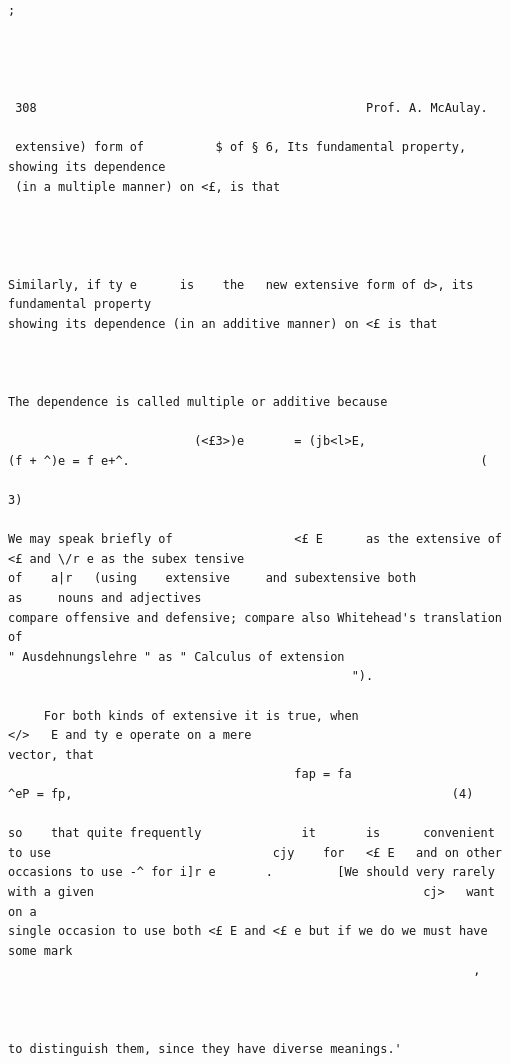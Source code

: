 \documentclass[10pt]{article}
\begin{document}
\begin{verbatim}

                                                                                                                                                 ;




 308                                              Prof. A. McAulay.

 extensive) form of          $ of § 6, Its fundamental property, showing its dependence
 (in a multiple manner) on <£, is that




Similarly, if ty e      is    the   new extensive form of d>, its fundamental property
showing its dependence (in an additive manner) on <£ is that



The dependence is called multiple or additive because

                          (<£3>)e       = (jb<l>E,                       (f + ^)e = f e+^.                                                 (
                                                                                                                                               3)

We may speak briefly of                 <£ E      as the extensive of <£ and \/r e as the subex tensive
of    a|r   (using    extensive     and subextensive both                                                as     nouns and adjectives
compare offensive and defensive; compare also Whitehead's translation of
" Ausdehnungslehre " as " Calculus of extension
                                                ").

     For both kinds of extensive it is true, when                                             </>   E and ty e operate on a mere
vector, that
                                        fap = fa                             ^eP = fp,                                                     (4)

so    that quite frequently              it       is      convenient to use                               cjy    for   <£ E   and on other
occasions to use -^ for i]r e       .         [We should very rarely with a given                                              cj>   want on a
single occasion to use both <£ E and <£ e but if we do we must have some mark
                                                                 ,



to distinguish them, since they have diverse meanings.'


\end{verbatim}
\end{document}

